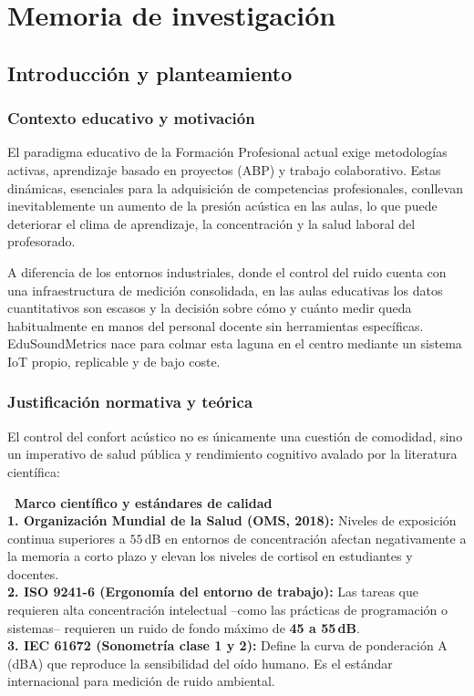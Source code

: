 \documentclass[11pt,a4paper,openany]{report}
\begin{document}
\part{Memoria de investigaci\'on}

\chapter{Introducci\'on y planteamiento}

\section{Contexto educativo y motivaci\'on}

El paradigma educativo de la Formaci\'on Profesional actual exige metodolog\'ias activas, aprendizaje basado en proyectos (ABP) y trabajo colaborativo. Estas din\'amicas, esenciales para la adquisici\'on de competencias profesionales, conllevan inevitablemente un aumento de la presi\'on ac\'ustica en las aulas, lo que puede deteriorar el clima de aprendizaje, la concentraci\'on y la salud laboral del profesorado.

A diferencia de los entornos industriales, donde el control del ruido cuenta con una infraestructura de medici\'on consolidada, en las aulas educativas los datos cuantitativos son escasos y la decisi\'on sobre c\'omo y cu\'anto medir queda habitualmente en manos del personal docente sin herramientas espec\'ificas. EduSoundMetrics nace para colmar esta laguna en el centro mediante un sistema IoT propio, replicable y de bajo coste.

\section{Justificaci\'on normativa y te\'orica}

El control del confort ac\'ustico no es \'unicamente una cuesti\'on de comodidad, sino un imperativo de salud p\'ublica y rendimiento cognitivo avalado por la literatura cient\'ifica:

\begin{HighlightBox}
\textbf{\faBook\ Marco cient\'ifico y est\'andares de calidad}\\[0.2em]
\textbf{1. Organizaci\'on Mundial de la Salud (OMS, 2018):} Niveles de exposici\'on continua superiores a $55$\,dB en entornos de concentraci\'on afectan negativamente a la memoria a corto plazo y elevan los niveles de cortisol en estudiantes y docentes.\\[0.2em]
\textbf{2. ISO 9241-6 (Ergonom\'ia del entorno de trabajo):} Las tareas que requieren alta concentraci\'on intelectual --como las pr\'acticas de programaci\'on o sistemas-- requieren un ruido de fondo m\'aximo de \textbf{45 a 55\,dB}.\\[0.2em]
\textbf{3. IEC 61672 (Sonometr\'ia clase 1 y 2):} Define la curva de ponderaci\'on A (dBA) que reproduce la sensibilidad del o\'ido humano. Es el est\'andar internacional para medici\'on de ruido ambiental.
\end{HighlightBox}
\end{document}
